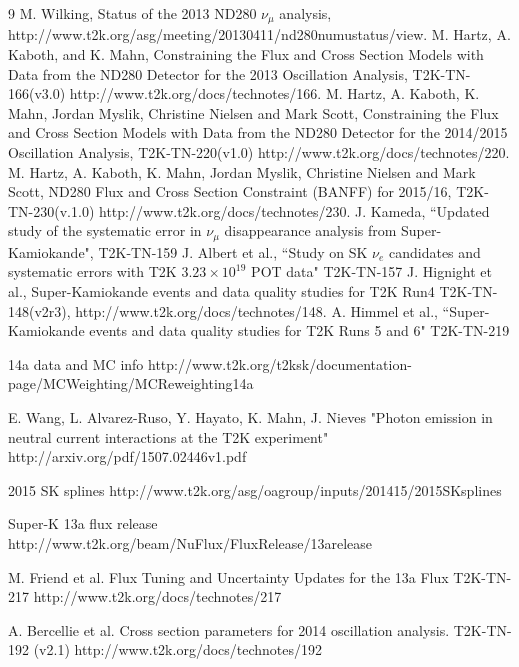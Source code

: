 \begin{thebibliography}{9}
  M. Wilking,
  Status of the 2013 ND280 $\nu_{\mu}$ analysis,\\
  http://www.t2k.org/asg/meeting/20130411/nd280numustatus/view.
  M. Hartz, A. Kaboth, and K. Mahn,
  Constraining the Flux and Cross Section Models with Data from the
  ND280 Detector for the 2013 Oscillation Analysis,
  T2K-TN-166(v3.0)
  http://www.t2k.org/docs/technotes/166.
  M. Hartz, A. Kaboth, K. Mahn, Jordan Myslik, Christine Nielsen and Mark Scott,
  Constraining the Flux and Cross Section Models with Data from the
  ND280 Detector for the 2014/2015 Oscillation Analysis,
  T2K-TN-220(v1.0)
  http://www.t2k.org/docs/technotes/220.
  M. Hartz, A. Kaboth, K. Mahn, Jordan Myslik, Christine Nielsen and Mark Scott,
 ND280 Flux and Cross Section Constraint (BANFF) for 2015/16,
  T2K-TN-230(v.1.0)
  http://www.t2k.org/docs/technotes/230.
J. Kameda,
``Updated study of the systematic error in $\nu_{\mu}$ disappearance analysis from Super-Kamiokande",
T2K-TN-159
J. Albert et al.,
``Study on SK $\nu_e$ candidates and systematic errors with T2K $3.23 \times 10^{19}$ POT data"
T2K-TN-157
   J. Hignight et al.,
   Super-Kamiokande events and data quality studies for T2K Run4
   T2K-TN-148(v2r3),
   http://www.t2k.org/docs/technotes/148.
A. Himmel et al.,
``Super-Kamiokande events and data quality studies for T2K Runs 5 and 6"
T2K-TN-219

%
%

   14a data and MC info
   http://www.t2k.org/t2ksk/documentation-page/MCWeighting/MCReweighting14a

   E. Wang, L. Alvarez-Ruso, Y. Hayato, K. Mahn, J. Nieves
   "Photon emission in neutral current interactions at the T2K experiment"
   http://arxiv.org/pdf/1507.02446v1.pdf

   2015 SK splines
   http://www.t2k.org/asg/oagroup/inputs/201415/2015SKsplines

   Super-K 13a flux release
   http://www.t2k.org/beam/NuFlux/FluxRelease/13arelease
   
   M. Friend et al. 
   Flux Tuning and Uncertainty Updates for the 13a Flux
      T2K-TN-217
   http://www.t2k.org/docs/technotes/217
   
   A. Bercellie et al.
   Cross section parameters for 2014 oscillation analysis.
   T2K-TN-192 (v2.1)
   http://www.t2k.org/docs/technotes/192
   

\end{thebibliography}
